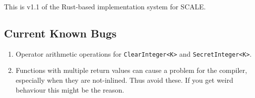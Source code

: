 
This is v1.1 of the Rust-based implementation system
for SCALE.

\subsection{Current Known Bugs}
\begin{enumerate}
\item Operator arithmetic operations for  \verb|ClearInteger<K>| and \verb|SecretInteger<K>|.
\item Functions with multiple return values can cause a problem for the compiler, especially
when they are not-inlined. Thus avoid these. If you get weird behaviour this might
be the reason.
\end{enumerate}

